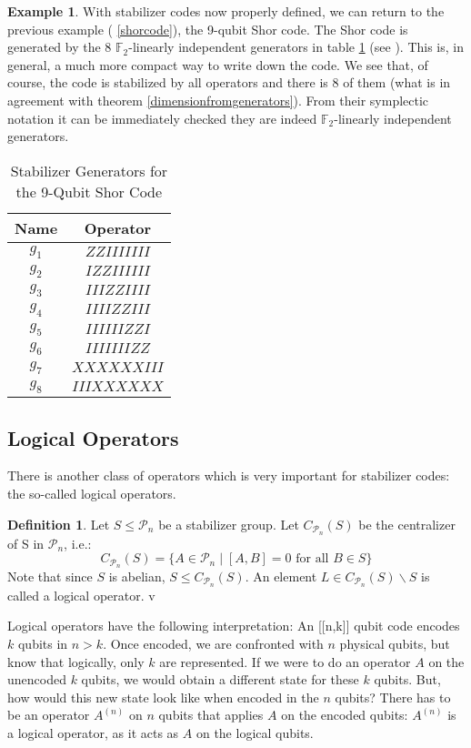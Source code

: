 \documentclass{article}
\def\P{\mathcal{P}}
\def\F{\mathbb{F}}
\theoremstyle{definition}
\newtheorem{ex}[Satz]{Example}
\newtheorem{defn}[Satz]{Definition}
\begin{document}
\begin{ex}\label{shorstab}
With stabilizer codes now properly defined, we can return to the previous example ( \ref{shorcode}), the 9-qubit Shor code. The Shor code is generated by the 8 $\F_2$-linearly independent generators in table  \ref{shorgenerators} (see \cite{NC}). This is, in general, a much more compact way to write down the code. We see that, of course, the code is stabilized by all operators and there is 8 of them (what is in agreement with theorem  \ref{dimensionfromgenerators}). From their symplectic notation it can be immediately checked they are indeed $\F_2$-linearly independent generators.
\begin{table}[h]
\centering 
\begin{tabular}{|c|c|}
\hline
Name & Operator \\ \hline
$g_1$ & $ZZIIIIIII$ \\ \hline
$g_2$ & $IZZIIIIII$ \\ \hline
$g_3$ & $IIIZZIIII$ \\ \hline
$g_4$ & $IIIIZZIII$ \\ \hline
$g_5$ & $IIIIIIZZI$ \\ \hline
$g_6$ & $IIIIIIIZZ$ \\ \hline
$g_7$ & $XXXXXXIII$ \\ \hline
$g_8$ & $IIIXXXXXX$ \\ \hline
\end{tabular}
\caption{ Stabilizer Generators for the 9-Qubit Shor Code}
\label{shorgenerators}
\end{table}
\end{ex}

\subsection{Logical Operators}
There is another class of operators which is very important for stabilizer codes: the so-called logical operators. 

\begin{defn}
Let $S \leq \P_n$ be a stabilizer group. Let $C_{\P_n}(S)$ be the centralizer of S in $\P_n$,  i.e.:
\[ C_{\P_n}(S) = \{ A \in \P_n \mid [A,B] = 0 \text{ for all } B \in S \} \]
Note that since $S$ is abelian, $S \leq C_{\P_n}(S)$. An element $L \in C_{\P_n}(S) \backslash S$ is called a logical operator.
v\end{defn}

Logical operators have the following interpretation:
An [[n,k]] qubit code encodes $k$ qubits in $n > k$. Once encoded, we are confronted with $n$ physical qubits, but know that logically, only $k$ are represented. If we were to do an operator $A$ on the unencoded $k$ qubits, 
we would obtain a different state for these $k$ qubits. But, how would this new state look like when encoded in the $n$ qubits? There has to be an operator $A^{(n)}$ on $n$ qubits that applies $A$ on the encoded qubits: $A^{(n)}$ is a logical
operator, as it acts as $A$ on the logical qubits.
\end{document}
